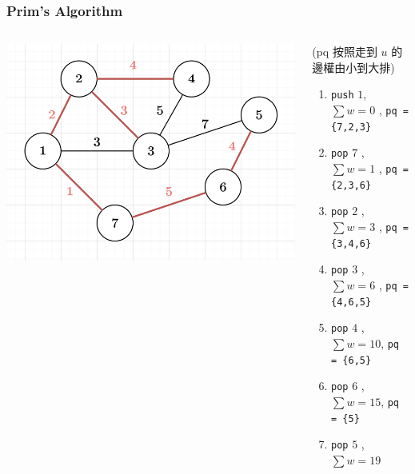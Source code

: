 \documentclass[aspectratio=169]{beamer}
\begin{document}
    \begin{frame}
        \frametitle{Prim's Algorithm}
        \begin{columns}
            \begin{column}{0.5 \textwidth}
                \begin{center}
                    \includegraphics[scale=0.4]{images/prim_example.png}
                \end{center}
            \end{column}
            \begin{column}{0.5 \textwidth}
                (pq 按照走到 $u$ 的邊權由小到大排)
                \begin{enumerate}
                    \item \texttt{push} $1$, $\sum w = 0$ , \texttt{pq = \{7,2,3\}}
                    \item \texttt{pop} $7$ , $\sum w = 1$ , \texttt{pq = \{2,3,6\}}
                    \item \texttt{pop} $2$ , $\sum w = 3$ , \texttt{pq = \{3,4,6\}}
                    \item \texttt{pop} $3$ , $\sum w = 6$ , \texttt{pq = \{4,6,5\}}
                    \item \texttt{pop} $4$ , $\sum w = 10$, \texttt{pq = \{6,5\}}
                    \item \texttt{pop} $6$ , $\sum w = 15$, \texttt{pq = \{5\}}
                    \item \texttt{pop} $5$ , $\sum w = 19$
                \end{enumerate}
            \end{column}
        \end{columns}
    \end{frame}
    
\end{document}

